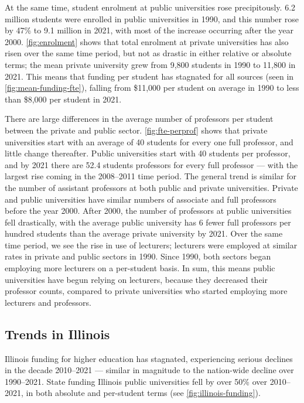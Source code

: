 At the same time, student enrolment at public universities rose precipitously.
6.2 million students were enrolled in public universities in 1990, and this number rose by 47\% to 9.1 million in 2021, with most of the increase occurring after the year 2000.
\autoref{fig:enrolment} shows that total enrolment at private universities has also risen over the same time period, but not as drastic in either relative or absolute terms; the mean private university grew from 9,800 students in 1990 to 11,800 in 2021.
This means that funding per student has stagnated for all sources (seen in \autoref{fig:mean-funding-fte}), falling from \$11,000 per student on average in 1990 to less than \$8,000 per student in 2021.

There are large differences in the average number of professors per student between the private and public sector.
\autoref{fig:fte-perprof} shows that private universities start with an average of 40 students for every one full professor, and little change thereafter.
Public universities start with 40 students per professor, and by 2021 there are 52.4 students professors for every full professor --- with the largest rise coming in the 2008--2011 time period.
The general trend is similar for the number of assistant professors at both public and private universities.
Private and public universities have similar numbers of associate and full professors before the year 2000.
After 2000, the number of professors at public universities fell drastically, with the average public university has 6 fewer full professors per hundred students than the average private university by 2021.
Over the same time period, we see the rise in use of lecturers; lecturers were employed at similar rates in private and public sectors in 1990.
Since 1990, both sectors began employing more lecturers on a per-student basis.
In sum, this means public universities have begun relying on lecturers, because they decreased their professor counts, compared to private universities who started employing more lecturers and professors.

\subsection{Trends in Illinois}
\label{sec:trends-illinois}
Illinois funding for higher education has stagnated, experiencing serious declines in the decade 2010--2021 --- similar in magnitude to the nation-wide decline over 1990--2021.
State funding Illinois public universities fell by over 50\% over 2010--2021, in both absolute and per-student terms (see \autoref{fig:illinois-funding}).


